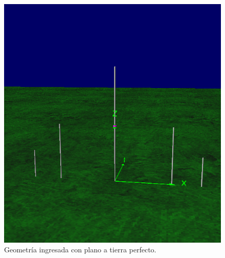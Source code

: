 \begin{figure}[H]
	\centering
	\includegraphics[scale=0.4]{imagenes/2_geometria_tierra.png}
	\caption{Geometría ingresada con plano a tierra perfecto.}
	\label{fig.geometria_tierra}
\end{figure}
